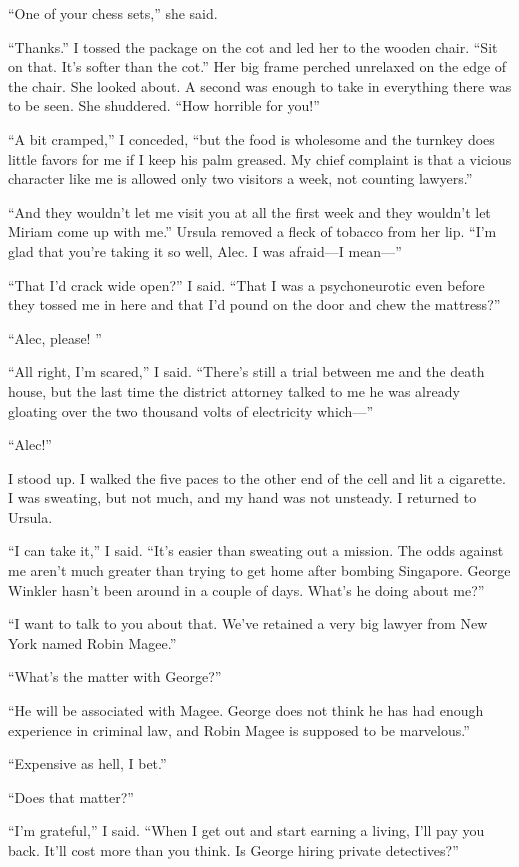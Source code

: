 \documentclass{novel}
\begin{document}
“One of your chess sets,” she said.

“Thanks.” I tossed the package on the cot and led her to the wooden chair. “Sit on that. It’s softer than the cot.” Her big frame perched unrelaxed on the edge of the chair. She looked about. A second was enough to take in everything there was to be seen. She shuddered. “How horrible for you!”

“A bit cramped,” I conceded, “but the food is wholesome and the turnkey does little favors for me if I keep his palm greased. My chief complaint is that a vicious character like me is allowed only two visitors a week, not counting lawyers.”

“And they wouldn’t let me visit you at all the first week and they wouldn’t let Miriam come up with me.” Ursula removed a fleck of tobacco from her lip. “I’m glad that you’re taking it so well, Alec. I was afraid—I mean—”

“That I’d crack wide open?” I said. “That I was a psychoneurotic even before they tossed me in here and that I’d pound on the door and chew the mattress?”

“Alec, please! ”

“All right, I’m scared,” I said. “There’s still a trial between me and the death house, but the last time the district attorney talked to me he was already gloating over the two thousand volts of electricity which—”

“Alec!”

I stood up. I walked the five paces to the other end of the cell and lit a cigarette. I was sweating, but not much, and my hand was not unsteady. I returned to Ursula.

“I can take it,” I said. “It’s easier than sweating out a mission. The odds against me aren’t much greater than trying to get home after bombing Singapore. George Winkler hasn’t been around in a couple of days. What’s he doing about me?”

“I want to talk to you about that. We’ve retained a very big lawyer from New York named Robin Magee.”

“What’s the matter with George?”

“He will be associated with Magee. George does not think he has had enough experience in criminal law, and Robin Magee is supposed to be marvelous.”

“Expensive as hell, I bet.”

“Does that matter?”

“I’m grateful,” I said. “When I get out and start earning a living, I’ll pay you back. It’ll cost more than you think. Is George hiring private detectives?”
\end{document}
